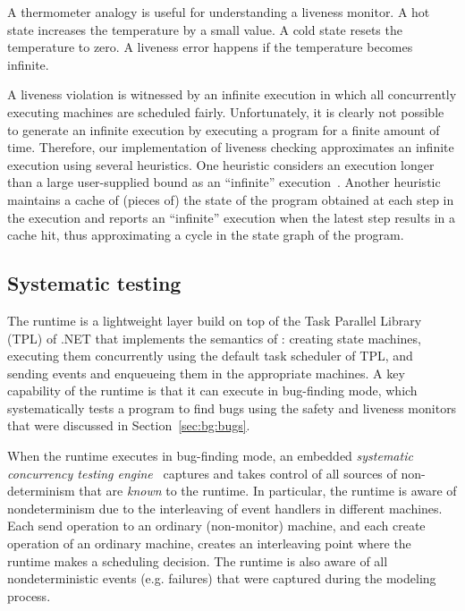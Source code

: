 A thermometer analogy is useful for understanding a liveness monitor.
A hot state increases the temperature by a small value.
A cold state resets the temperature to zero.
A liveness error happens if the temperature becomes infinite.

A liveness violation is witnessed by an infinite execution in which all concurrently executing \psharp machines are scheduled fairly.
Unfortunately, it is clearly not possible to generate an infinite execution by executing a program for a finite amount of time.
Therefore, our implementation of liveness checking approximates an infinite execution using several heuristics.
One heuristic considers an execution longer than a large user-supplied bound as an ``infinite'' execution~\cite{killian2007life, musuvathi2008fair}.
Another heuristic maintains a cache of (pieces of) the state of the \psharp program obtained at each step in the execution
and reports an ``infinite'' execution when the latest step results in a cache hit, thus approximating a cycle in the state
graph of the program.

\subsection{Systematic testing}
\label{sec:psharp:testing}

The \psharp runtime is a lightweight layer build on top of the Task Parallel Library (TPL) of .NET that implements the semantics of \psharp: creating state machines, executing them concurrently using the default task scheduler of TPL, and sending events and enqueueing them in the appropriate machines. A key capability of the \psharp runtime is that it can execute in bug-finding mode, which systematically tests a \psharp program to find bugs using the safety and liveness monitors that were discussed in Section~\ref{sec:bg:bugs}.

When the \psharp runtime executes in bug-finding mode, an embedded \emph{systematic concurrency testing engine}~\cite{godefroid1997verisoft, musuvathi2008finding, emmi2011delay} captures and takes control of all sources of non-determinism that are \emph{known} to the \psharp runtime. In particular, the runtime is aware of nondeterminism due to the interleaving of event handlers in different machines. Each send operation to an ordinary (non-monitor) machine, and each create operation of an ordinary machine, creates an interleaving point where the runtime makes a scheduling decision. The runtime is also aware of all nondeterministic events (e.g. failures) that were captured during the modeling process.

